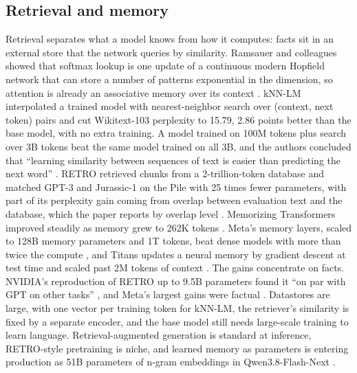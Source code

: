\subsection{Retrieval and memory}
Retrieval separates what a model knows from how it computes: facts sit in an external store that the network queries by similarity. Ramsauer and colleagues showed that softmax lookup is one update of a continuous modern Hopfield network that can store a number of patterns exponential in the dimension, so attention is already an associative memory over its context \cite{post21}. kNN-LM interpolated a trained model with nearest-neighbor search over (context, next token) pairs and cut Wikitext-103 perplexity to 15.79, 2.86 points better than the base model, with no extra training. A model trained on 100M tokens plus search over 3B tokens beat the same model trained on all 3B, and the authors concluded that ``learning similarity between sequences of text is easier than predicting the next word'' \cite{post18}. RETRO retrieved chunks from a 2-trillion-token database and matched GPT-3 and Jurassic-1 on the Pile with 25 times fewer parameters, with part of its perplexity gain coming from overlap between evaluation text and the database, which the paper reports by overlap level \cite{post19}. Memorizing Transformers improved steadily as memory grew to 262K tokens \cite{post20}. Meta's memory layers, scaled to 128B memory parameters and 1T tokens, beat dense models with more than twice the compute \cite{post23}, and Titans updates a neural memory by gradient descent at test time and scaled past 2M tokens of context \cite{post24}. The gains concentrate on facts. NVIDIA's reproduction of RETRO up to 9.5B parameters found it ``on par with GPT on other tasks'' \cite{post22}, and Meta's largest gains were factual \cite{post23}. Datastores are large, with one vector per training token for kNN-LM, the retriever's similarity is fixed by a separate encoder, and the base model still needs large-scale training to learn language. Retrieval-augmented generation is standard at inference, RETRO-style pretraining is niche, and learned memory as parameters is entering production as 51B parameters of n-gram embeddings in Qwen3.8-Flash-Next \cite{post12}.

